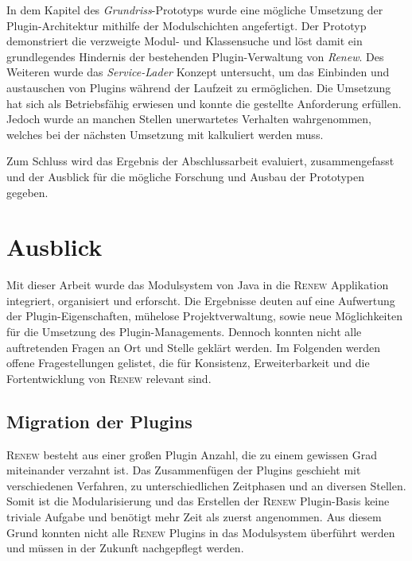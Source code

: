 In dem Kapitel des \textit{Grundriss}-Prototyps wurde eine mögliche Umsetzung der Plugin-Architektur mithilfe der Modulschichten angefertigt. Der Prototyp demonstriert die verzweigte Modul- und Klassensuche und löst damit ein grundlegendes Hindernis der bestehenden Plugin-Verwaltung von \textit{Renew}. Des Weiteren wurde das \textit{Service-Lader} Konzept untersucht, um das Einbinden und austauschen von Plugins während der Laufzeit zu ermöglichen. Die Umsetzung hat sich als Betriebsfähig erwiesen und konnte die gestellte Anforderung erfüllen. Jedoch wurde an manchen Stellen unerwartetes Verhalten wahrgenommen, welches bei der nächsten Umsetzung mit kalkuliert werden muss. \bigbreak

Zum Schluss wird das Ergebnis der Abschlussarbeit evaluiert, zusammengefasst und der Ausblick für die mögliche Forschung und Ausbau der Prototypen gegeben. 


\section{Ausblick} 
	Mit dieser Arbeit wurde das Modulsystem von Java in die \textsc{Renew} Applikation integriert, organisiert und erforscht. Die Ergebnisse deuten auf eine Aufwertung der Plugin-Eigenschaften, mühelose Projektverwaltung, sowie neue Möglichkeiten für die Umsetzung des Plugin-Managements. Dennoch konnten nicht alle auftretenden Fragen an Ort und Stelle geklärt werden.\bigbreak
	Im Folgenden werden offene Fragestellungen gelistet, die für Konsistenz, Erweiterbarkeit und die Fortentwicklung von \textsc{Renew} relevant sind.  
	
 \subsection*{Migration der Plugins}
	\textsc{Renew} besteht aus einer großen Plugin Anzahl, die zu einem gewissen Grad miteinander verzahnt ist. Das  Zusammenfügen der Plugins geschieht mit verschiedenen Verfahren, zu unterschiedlichen Zeitphasen und an diversen Stellen. Somit ist die Modularisierung und das Erstellen der \textsc{Renew} Plugin-Basis keine triviale Aufgabe und benötigt mehr Zeit als zuerst angenommen. Aus diesem Grund konnten nicht alle \textsc{Renew} Plugins in das Modulsystem überführt werden und müssen in der Zukunft nachgepflegt werden. 

